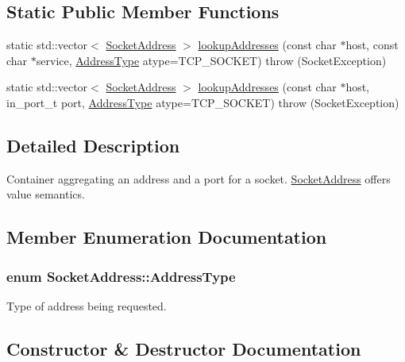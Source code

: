 \subsection*{Static Public Member Functions}
\begin{DoxyCompactItemize}
\item 
static std\+::vector$<$ \hyperlink{class_socket_address}{Socket\+Address} $>$ \hyperlink{class_socket_address_afd69ab208c861e71cd323e38694ccb92}{lookup\+Addresses} (const char $\ast$host, const char $\ast$service, \hyperlink{class_socket_address_a5a3cef579d48a2f4ea15034da2432e6f}{Address\+Type} atype=T\+C\+P\+\_\+\+S\+O\+C\+K\+ET)  throw (\+Socket\+Exception)
\item 
static std\+::vector$<$ \hyperlink{class_socket_address}{Socket\+Address} $>$ \hyperlink{class_socket_address_a153f5c22e865c3f9ab1a6be1906b9059}{lookup\+Addresses} (const char $\ast$host, in\+\_\+port\+\_\+t port, \hyperlink{class_socket_address_a5a3cef579d48a2f4ea15034da2432e6f}{Address\+Type} atype=T\+C\+P\+\_\+\+S\+O\+C\+K\+ET)  throw (\+Socket\+Exception)
\end{DoxyCompactItemize}


\subsection{Detailed Description}
Container aggregating an address and a port for a socket. \hyperlink{class_socket_address}{Socket\+Address} offers value semantics. 

\subsection{Member Enumeration Documentation}
\subsubsection[{\texorpdfstring{Address\+Type}{AddressType}}]{\setlength{\rightskip}{0pt plus 5cm}enum {\bf Socket\+Address\+::\+Address\+Type}}\hypertarget{class_socket_address_a5a3cef579d48a2f4ea15034da2432e6f}{}\label{class_socket_address_a5a3cef579d48a2f4ea15034da2432e6f}
Type of address being requested. 

\subsection{Constructor \& Destructor Documentation}
